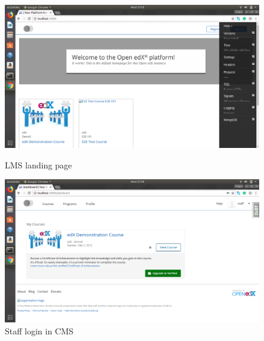 \begin{figure}[ht]
  \centering
  \includegraphics[width=\textwidth]{images/devstack_0}
  \caption{LMS landing page}

  \vspace*{\floatsep}

  \includegraphics[width=\textwidth]{images/devstack_1}
  \caption{Staff login in CMS}
\end{figure}

